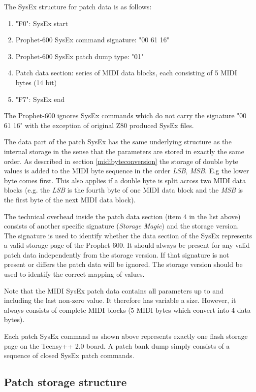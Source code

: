 The SysEx structure for patch data is as follows:

\begin{enumerate}
  \item "F0": SysEx start
  \item Prophet-600 SysEx command signature: "00 61 16"
  \item Prophet-600 SysEx patch dump type: "01"
  \item Patch data section: series of MIDI data blocks, each consisting of 5 MIDI bytes (14 bit) 
  \item "F7": SysEx end
\end{enumerate}

The Prophet-600 ignores SysEx commands which do not carry the signature "00 61 16" with the exception of original Z80 produced SysEx files.

The data part of the patch SysEx has the same underlying structure as the internal storage in the sense that the parameters are stored in exactly the same order. As described in section \ref{midibyteconversion} the storage of double  byte values is added to the MIDI byte sequence in the order \textit{LSB}, \textit{MSB}. E.g the lower byte comes first. This also applies if a double byte is split across two MIDI data blocks (e.g. the \textit{LSB} is the fourth byte of one MIDI data block and the \textit{MSB} is the first byte of the next MIDI data block). 

The technical overhead inside the patch data section (item 4 in the list above) consists of another specific signature (\textit{Storage Magic}) and the storage version. The signature is used to identify whether the data section of the SysEx represents a valid storage page of the Prophet-600. It should  always be present for any valid patch data independently from the storage version. If that signature is not present or differs the patch data will be ignored. The storage version should be used to identify the correct mapping of values.  

Note that the MIDI SysEx patch data contains all parameters up to and including the last non-zero value. It therefore has variable a size. However, it always consists of complete MIDI blocks (5 MIDI bytes which convert into 4 data bytes).

Each patch SysEx command as shown above represents exactly one flash storage page on the Teensy++ 2.0 board. A patch bank dump simply consists of a sequence of closed SysEx patch commands.

\subsection{Patch storage structure}\label{patchstore}


